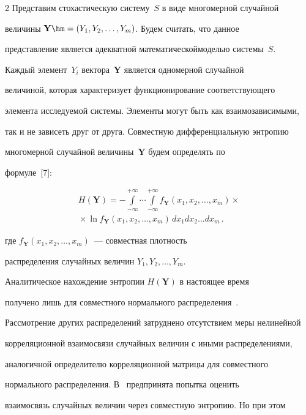 \begin{multicols}{2}
  Представим стохастическую систему~$S$ в виде многомерной случайной 

величины $\mathbf{Y}\hm=(Y_1, Y_2,\ldots , Y_m)$. Будем считать, что данное 

представление является адекватной математической\linebreak моделью системы~$S$. 

Каждый элемент~$Y_i$ вектора~\textbf{Y} является одномерной случайной 

величиной, которая характеризует функционирование соответствующего 

элемента исследуемой системы. Элементы могут быть как взаимозависимыми, 

так и не зависеть друг от друга. Совместную дифференциальную энтропию 

многомерной случайной величины~$\mathbf{Y}$ будем определять по 

формуле~[7]:

  \begin{multline}

  H(\mathbf{Y})=-\int\limits_{-\infty}^{+\infty} \cdots \int\limits_{-

\infty}^{+\infty} f_{\mathbf{Y}}(x_1,x_2,\ldots ,x_m)\times{}\\

{}\times \ln  f_{\mathbf{Y}}(x_1,x_2,\ldots ,x_m)\,dx_1dx_2\ldots dx_m\,.

  \label{e2-t}

  \end{multline}

  где $ f_{\mathbf{Y}}(x_1,x_2,\ldots ,x_m)$~--- совместная плотность 

распределения случайных величин $Y_1, Y_2, \ldots , Y_m$.

  

  Аналитическое нахождение энтропии $H(\mathbf{Y})$ в настоящее время 

получено лишь для совместного нормального распределения~\cite{8-t}. 

Рассмотрение других распределений затруднено отсутствием меры нелинейной 

корреляционной взаимосвязи случайных величин с иными распределениями, 

аналогичной определителю корреляционной матрицы для совместного 

нормального распределения. В~\cite{9-t} предпринята попытка оценить 

взаимосвязь случайных величин через совместную энтропию. Но при этом 


\end{multicols}
